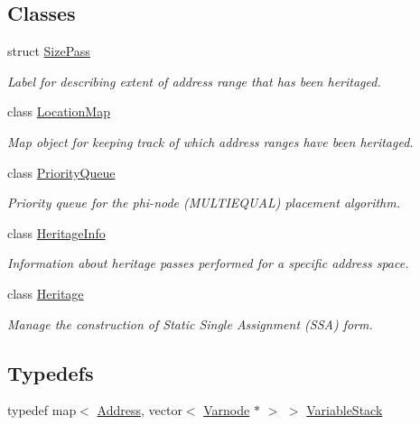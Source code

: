 \subsection*{Classes}
\begin{DoxyCompactItemize}
\item 
struct \mbox{\hyperlink{struct_size_pass}{Size\+Pass}}
\begin{DoxyCompactList}\small\item\em Label for describing extent of address range that has been heritaged. \end{DoxyCompactList}\item 
class \mbox{\hyperlink{class_location_map}{Location\+Map}}
\begin{DoxyCompactList}\small\item\em Map object for keeping track of which address ranges have been heritaged. \end{DoxyCompactList}\item 
class \mbox{\hyperlink{class_priority_queue}{Priority\+Queue}}
\begin{DoxyCompactList}\small\item\em Priority queue for the phi-\/node (M\+U\+L\+T\+I\+E\+Q\+U\+AL) placement algorithm. \end{DoxyCompactList}\item 
class \mbox{\hyperlink{class_heritage_info}{Heritage\+Info}}
\begin{DoxyCompactList}\small\item\em Information about heritage passes performed for a specific address space. \end{DoxyCompactList}\item 
class \mbox{\hyperlink{class_heritage}{Heritage}}
\begin{DoxyCompactList}\small\item\em Manage the construction of Static Single Assignment (S\+SA) form. \end{DoxyCompactList}\end{DoxyCompactItemize}
\subsection*{Typedefs}
\begin{DoxyCompactItemize}
\item 
typedef map$<$ \mbox{\hyperlink{class_address}{Address}}, vector$<$ \mbox{\hyperlink{class_varnode}{Varnode}} $\ast$ $>$ $>$ \mbox{\hyperlink{heritage_8hh_a06c866be068de18f657eeea50b3790ba}{Variable\+Stack}}
\end{DoxyCompactItemize}


